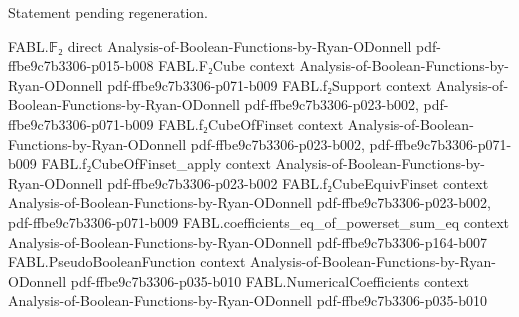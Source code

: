 \begin{theorem}
\leanok
{}
Statement pending regeneration.
\end{theorem}

\begin{theorem}
\label{FABL.numericalMobiusCoeff_eq_numericalCoeff}
\leanok
{}
\proofstep
  {FABL.𝔽₂}
  {direct}
  {Analysis-of-Boolean-Functions-by-Ryan-ODonnell}
  {pdf-ffbe9c7b3306-p015-b008}
\proofstep
  {FABL.F₂Cube}
  {context}
  {Analysis-of-Boolean-Functions-by-Ryan-ODonnell}
  {pdf-ffbe9c7b3306-p071-b009}
\proofstep
  {FABL.f₂Support}
  {context}
  {Analysis-of-Boolean-Functions-by-Ryan-ODonnell}
  {pdf-ffbe9c7b3306-p023-b002,
    pdf-ffbe9c7b3306-p071-b009}
\proofstep
  {FABL.f₂CubeOfFinset}
  {context}
  {Analysis-of-Boolean-Functions-by-Ryan-ODonnell}
  {pdf-ffbe9c7b3306-p023-b002,
    pdf-ffbe9c7b3306-p071-b009}
\proofstep
  {FABL.f₂CubeOfFinset_apply}
  {context}
  {Analysis-of-Boolean-Functions-by-Ryan-ODonnell}
  {pdf-ffbe9c7b3306-p023-b002}
\proofstep
  {FABL.f₂CubeEquivFinset}
  {context}
  {Analysis-of-Boolean-Functions-by-Ryan-ODonnell}
  {pdf-ffbe9c7b3306-p023-b002,
    pdf-ffbe9c7b3306-p071-b009}
\proofstep
  {FABL.coefficients_eq_of_powerset_sum_eq}
  {context}
  {Analysis-of-Boolean-Functions-by-Ryan-ODonnell}
  {pdf-ffbe9c7b3306-p164-b007}
\proofstep
  {FABL.PseudoBooleanFunction}
  {context}
  {Analysis-of-Boolean-Functions-by-Ryan-ODonnell}
  {pdf-ffbe9c7b3306-p035-b010}
\proofstep
  {FABL.NumericalCoefficients}
  {context}
  {Analysis-of-Boolean-Functions-by-Ryan-ODonnell}
  {pdf-ffbe9c7b3306-p035-b010}
\proofstep

\end{theorem}
